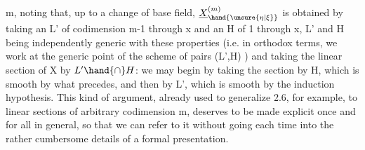 
m, noting that, up to a change of base field, $\underline{X}^{(m)}_{\hand{\unsure{\eta|\xi}}}$ is obtained by
taking an L' of codimension m-1 through x and an H of 
1 through x, L' and H being independently generic with these properties
(i.e. in orthodox terms, we work at the generic point of the 
scheme of pairs (L',H) ) and taking the linear section
of X by $L'\hand{\cap} H$: we may begin by taking the section by H, which
is smooth by what precedes, and then by L', which is smooth by the induction
hypothesis. This kind of argument, already used to generalize
2.6, for example, to linear sections of arbitrary codimension m, deserves
to be made explicit once and for all in general, so that we can refer to it without
going  each time into the rather cumbersome details of a formal
presentation.

